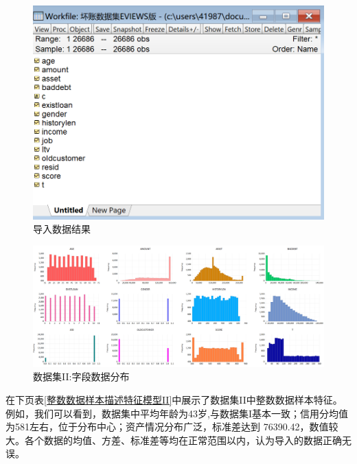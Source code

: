 \documentclass[13.5pt,hyperref,a4paper,UTF8]{ctexart}
\begin{document}
\begin{figure}[H]
    \centering
    \includegraphics[width=0.7\linewidth]{figures//2DATABASE//db2/导入数据2结果.png}
    \caption{导入数据结果}
    \label{模型2导入数据2结果}
\end{figure}

\begin{figure}[H]
    \centering
    \includegraphics[width=1.1\linewidth]{figures//2DATABASE//db2/模型II的数据分布.png}
    \caption{数据集II:字段数据分布}
    \label{模型II的数据分布}
\end{figure}

在下页表\ref{整数数据样本描述特征模型II}中展示了数据集II中整数数据样本特征。例如，我们可以看到，数据集中平均年龄为43岁,与数据集I基本一致；信用分均值为581左右，位于分布中心；资产情况分布广泛，标准差达到 76390.42，数值较大。各个数据的均值、方差、标准差等均在正常范围以内，认为导入的数据正确无误。
\end{document}
